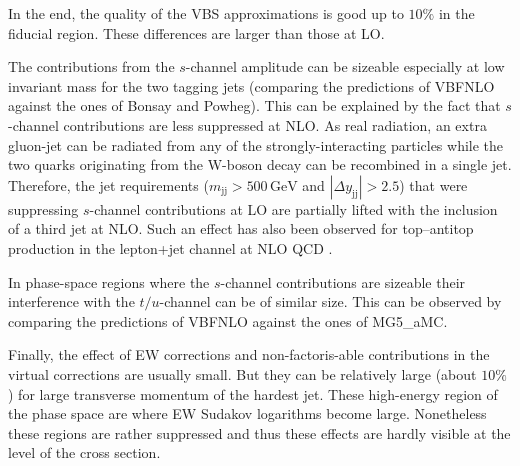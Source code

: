 \documentclass[twocolumn,epjc3]{svjour3} %
\newcommand{\Pj}{\ensuremath{\text{j}}\xspace}
\newcommand{\GeV}{\ensuremath{\,\text{GeV}}\xspace}
\begin{document}
    In the end, the quality of the VBS approximations is good up to $10\%$ in the fiducial region.
    These differences are larger than those at LO.

    The contributions from the $s$-channel amplitude can be sizeable especially at low invariant mass for the two tagging jets (comparing the predictions of {\sc VBFNLO} against the ones of {\sc Bonsay} and {\sc Powheg}).
    This can be explained by the fact that $s$-channel contributions are less suppressed at NLO.
    As real radiation, an extra gluon-jet can be radiated from any of the strongly-interacting particles while the two quarks originating from the W-boson decay can be recombined in a single jet.
    Therefore, the jet requirements ($ m_{\Pj \Pj} >  500\GeV$ and $|\Delta y_{\Pj \Pj}| > 2.5$) that were suppressing $s$-channel contributions at LO are partially lifted with the inclusion of a third jet at NLO.
    Such an effect has also been observed for top--antitop production in the lepton+jet channel at NLO QCD \cite{Denner:2017kzu}.

    In phase-space regions where the $s$-channel contributions are sizeable their interference with the $t/u$-channel can be of similar size.
    This can be observed by comparing the predictions of {\sc VBFNLO} against the ones of {\sc MG5\_aMC}.

    Finally, the effect of EW corrections and non-\-factoris\hyp{}able contributions in the virtual corrections are usually small.
    But they can be relatively large (about $10\%$) for large transverse momentum of the hardest jet.
    These high-energy region of the phase space are where EW Sudakov logarithms become large.
    Nonetheless these regions are rather suppressed and thus these effects are hardly visible at the level of the cross section.
\end{document}
